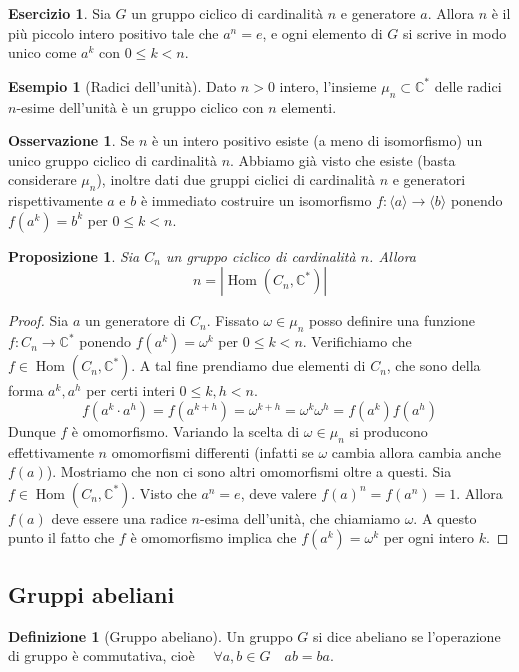\documentclass[11pt]{article}
\theoremstyle{plain}
\newtheorem{prop}[thm]{Proposizione}
\theoremstyle{definition}
\newtheorem{defn}{Definizione}[section]
\newtheorem{exmp}{Esempio}[section]
\newtheorem{exercise}{Esercizio}[section]
\newtheorem*{rem}{Osservazione}
\theoremstyle{remark}
\newcommand{\C}{\mathbb{C}}
\DeclareMathOperator{\Hom}{Hom}
\begin{document}
\begin{exercise}
Sia $G$ un gruppo ciclico di cardinalità $n$ e generatore $a$. Allora $n$ è il più piccolo intero positivo tale che $a^n = e$,
e ogni elemento di $G$ si scrive in modo unico come $a^k$ con $0\le k < n$.
\end{exercise}

\begin{exmp}[Radici dell'unità]
Dato $n>0$ intero, l'insieme $\mu_n\subset \C^*$ delle radici $n$-esime dell'unità è un gruppo ciclico con $n$ elementi.
\end{exmp}

\begin{rem} Se $n$ è un intero positivo esiste (a meno di isomorfismo) un unico gruppo ciclico di cardinalità $n$.
Abbiamo già visto che esiste (basta considerare $\mu_n$),
inoltre dati due gruppi ciclici di cardinalità $n$ e generatori rispettivamente $a$ e $b$ è immediato costruire un
isomorfismo $f:\langle a\rangle\to\langle b\rangle$ ponendo $f(a^k) = b^k$ per $0\le k < n$.
\end{rem}


\begin{prop} Sia $C_n$ un gruppo ciclico di cardinalità $n$. Allora
\[ n = |\Hom(C_n,\C^*)|\]
\label{prop:hom_ciclici}
\end{prop}
\begin{proof} Sia $a$ un generatore di $C_n$. Fissato $\omega\in\mu_n$ posso definire
una funzione $f:C_n\to\C^*$ ponendo $f(a^k) = \omega^k$ per $0\le k < n$.
Verifichiamo che $f\in \Hom(C_n, \C^*)$. A tal fine prendiamo due elementi di $C_n$, che sono della forma $a^k, a^h$ per certi interi $0\le k,h < n$.
\[f(a^k \cdot a^h) = f(a^{k+h}) = \omega^{k+h} = \omega^k \omega^h = f(a^k)f(a^h)\]
Dunque $f$ è omomorfismo. Variando la scelta di $\omega\in\mu_n$ si producono effettivamente $n$ omomorfismi differenti (infatti se $\omega$ cambia allora cambia anche $f(a)$).
Mostriamo che non ci sono altri omomorfismi oltre a questi.
Sia $f\in \Hom(C_n,\C^*)$. Visto che $a^n=e$, deve valere $f(a)^n = f(a^n) = 1$. Allora $f(a)$ deve essere una radice $n$-esima
dell'unità, che chiamiamo $\omega$. A questo punto il fatto che $f$ è omomorfismo implica che $f(a^k) = \omega^k$ per ogni intero $k$.
\end{proof}


\subsection{Gruppi abeliani}
\begin{defn}[Gruppo abeliano] Un gruppo $G$ si dice abeliano se l'operazione di gruppo è commutativa, cioè $\quad\forall a,b\in G\quad ab=ba$.
\end{defn}
\end{document}
